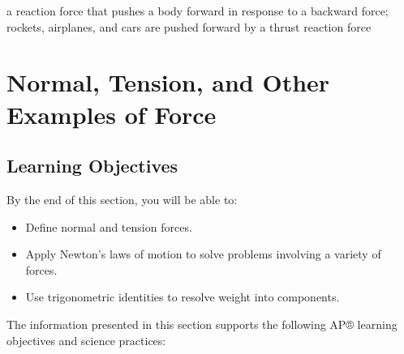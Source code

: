\documentclass[
]{book}
\providecommand{\tightlist}{%
  \setlength{\itemsep}{0pt}\setlength{\parskip}{0pt}}
\newenvironment{learning-objectives}{}{}
\begin{document}
\begin{description}
\tightlist
\item[thrust]
a reaction force that pushes a body forward in response to a
backward force; rockets, airplanes, and cars are pushed forward by a
thrust reaction force
\end{description}

\hypertarget{normal-tension-and-other-examples-of-force}{%
\section{Normal, Tension, and Other Examples of Force}\label{normal-tension-and-other-examples-of-force}}

\hypertarget{fs-id1904445}{}
\begin{learning-objectives}

\hypertarget{learning-objectives-16}{%
\subsection{Learning Objectives}\label{learning-objectives-16}}

By the end of this section, you will be able to:

\begin{itemize}
\tightlist
\item
  Define normal and tension forces.
\item
  Apply Newton's laws of motion to solve problems involving a variety
  of forces.
\item
  Use trigonometric identities to resolve weight into components.
\end{itemize}

The information presented in this section supports the following AP®
learning objectives and science practices:


\end{learning-objectives}
\end{document}
